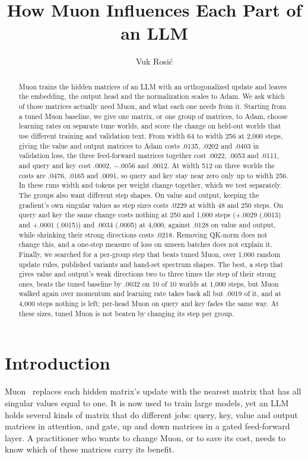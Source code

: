 \documentclass[11pt]{article}
\title{How Muon Influences Each Part of an LLM}
\author{Vuk Rosi\'c}
\date{}
\begin{document}
\maketitle

\begin{abstract}
Muon trains the hidden matrices of an LLM with an orthogonalized update and leaves the embedding, the output head and the normalization scales to Adam. We ask which of those matrices actually need Muon, and what each one needs from it. Starting from a tuned Muon baseline, we give one matrix, or one group of matrices, to Adam, choose learning rates on separate tune worlds, and score the change on held-out worlds that use different training and validation text. From width 64 to width 256 at 2,000 steps, giving the value and output matrices to Adam costs .0135, .0202 and .0403 in validation loss, the three feed-forward matrices together cost .0022, .0053 and .0111, and query and key cost .0002, $-.0056$ and .0012. At width 512 on three worlds the costs are .0476, .0165 and .0091, so query and key stay near zero only up to width 256. In these runs width and tokens per weight change together, which we test separately. The groups also want different step shapes. On value and output, keeping the gradient's own singular values as step sizes costs .0229 at width 48 and 250 steps. On query and key the same change costs nothing at 250 and 1,000 steps ($+.0029$ (.0013) and $+.0001$ (.0015)) and $.0034$ (.0005) at 4,000, against $.0128$ on value and output, while shrinking their strong directions costs .0218. Removing QK-norm does not change this, and a one-step measure of loss on unseen batches does not explain it. Finally, we searched for a per-group step that beats tuned Muon, over 1,000 random update rules, published variants and hand-set spectrum shapes. The best, a step that gives value and output's weak directions two to three times the step of their strong ones, beats the tuned baseline by .0032 on 10 of 10 worlds at 1,000 steps, but Muon walked again over momentum and learning rate takes back all but .0019 of it, and at 4,000 steps nothing is left; per-head Muon on query and key fades the same way. At these sizes, tuned Muon is not beaten by changing its step per group.
\end{abstract}

\section{Introduction}

Muon~\cite{muon} replaces each hidden matrix's update with the nearest matrix that has all singular values equal to one. It is now used to train large models, yet an LLM holds several kinds of matrix that do different jobs: query, key, value and output matrices in attention, and gate, up and down matrices in a gated feed-forward layer. A practitioner who wants to change Muon, or to save its cost, needs to know which of these matrices carry its benefit.
\end{document}
